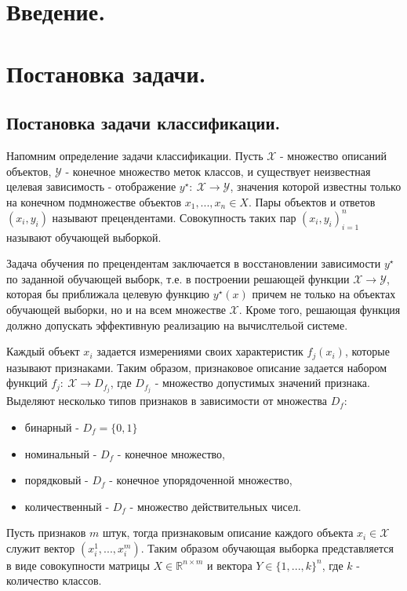 \documentclass[12pt]{article}
\begin{document}
\tableofcontents
\newpage

\section{Введение.}


\section{Постановка задачи.}


\subsection{Постановка задачи классификации.}

\par
Напомним определение задачи классификации. 
Пусть $\mathcal{X}$ - множество описаний объектов, 
$\mathcal{Y}$ - конечное множество меток классов, и 
существует неизвестная целевая зависимость - отображение 
$y^\star:\ \mathcal{X} \to \mathcal{Y}$, 
значения которой известны только на конечном подмножестве объектов
$x_1, ..., x_n \in X$. Пары объектов и ответов $(x_i, y_i)$ называют прецендентами.
Совокупность таких пар ${(x_i, y_i)}_{i=1}^n$ называют обучающей выборкой.
\par
Задача обучения по прецендентам заключается в восстановлении зависимости $y^\star$
по заданной обучающей выборк, т.е. в построении решающей функции 
$\mathcal{X} \to \mathcal{Y}$, которая бы
приближала целевую функцию $y^\star(x)$ причем не только на объектах обучающей выборки,
но и на всем множестве $\mathcal{X}$. Кроме того, решающая функция должно допускать эффективную
реализацию на вычислтельой системе.
\par
Каждый объект $x_i$ задается измерениями своих характеристик $f_j(x_i)$, 
которые называют признаками. Таким образом, признаковое описание задается набором функций
$f_j:\ \mathcal{X}\to D_{f_j}$, где $D_{f_j}$ - множество допустимых значений признака.
Выделяют несколько типов признаков в зависимости от множества $D_f$:
\begin{itemize} 
    \item бинарный - $D_f=\{0,1\}$
    \item номинальный - $D_f$ - конечное множество,
    \item порядковый - $D_f$ - конечное упорядоченной множество,
    \item количественный - $D_f$ - множество действительных чисел.
\end{itemize}
Пусть признаков $m$ штук, тогда признаковым описание каждого объекта 
$x_i \in \mathcal{X}$ служит вектор $(x_i^1, ..., x_i^m)$. 
Таким образом обучающая выборка представляется в виде совокупности матрицы 
$X \in \mathbb{R}^{n \times m}$ и вектора $Y \in \{1, ..., k\}^n$, где 
$k$ - количество классов.
\end{document}
